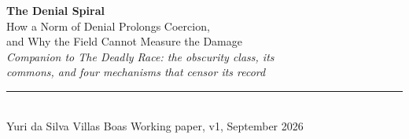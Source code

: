 \documentclass[a4paper,11pt]{article}
\theoremstyle{gw}
\theoremstyle{definition}
\theoremstyle{remark}
\begin{document}

\thispagestyle{plain}
\begin{center}
{\fontsize{22}{26}\selectfont\bfseries\color{accent}The Denial Spiral}\\[8pt]
{\large How a Norm of Denial Prolongs Coercion,\\
 and Why the Field Cannot Measure the Damage}\\[7pt]
{\normalsize\itshape\color{graytext}Companion to \emph{The Deadly Race}: the obscurity
 class, its\\ commons, and four mechanisms that censor its record}\\[12pt]
{\color{accent}\rule{78mm}{0.5pt}}\\[9pt]
{\small\color{graytext}Yuri da Silva Villas Boas \textperiodcentered{} Working paper, v1, September 2026}
\end{center}

\vspace{6pt}
\end{document}
